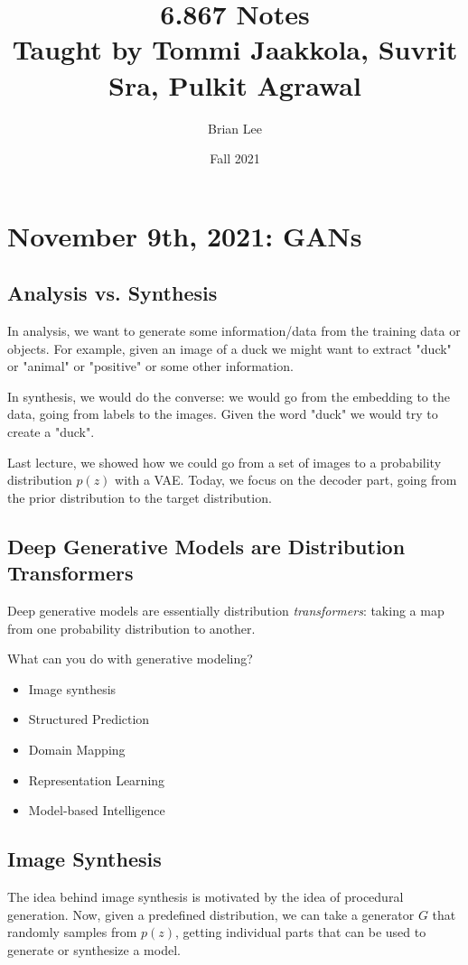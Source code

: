 \documentclass[11pt]{scrartcl}
\title{\Large 6.867 Notes\\ 
\large Taught by Tommi Jaakkola, Suvrit Sra, Pulkit Agrawal}
\subtitle{}
\author{\small Brian Lee}
\date{\small Fall 2021}
\begin{document}
\setcounter{section}{16}
\section{November 9th, 2021: GANs}

\subsection{Analysis vs. Synthesis}
In analysis, we want to generate some information/data from the training data or objects. For example, given an image of a duck we might want to extract "duck" or "animal" or "positive" or some other information. 

In synthesis, we would do the converse: we would go from the embedding to the data, going from labels to the images. Given the word "duck" we would try to create a "duck". 

Last lecture, we showed how we could go from a set of images to a probability distribution $p(z)$ with a VAE. Today, we focus on the decoder part, going from the prior distribution to the target distribution. 

\subsection{Deep Generative Models are Distribution Transformers}
Deep generative models are essentially distribution \textit{transformers}: taking a map from one probability distribution to another. 

What can you do with generative modeling? 
\begin{itemize}
    \item Image synthesis
    \item Structured Prediction
    \item Domain Mapping
    \item Representation Learning
    \item Model-based Intelligence
\end{itemize}

\subsection{Image Synthesis}
The idea behind image synthesis is motivated by the idea of procedural generation. Now, given a predefined distribution, we can take a generator $G$ that randomly samples from $p(z)$, getting individual parts that can be used to generate or synthesize a model. 
\end{document}
